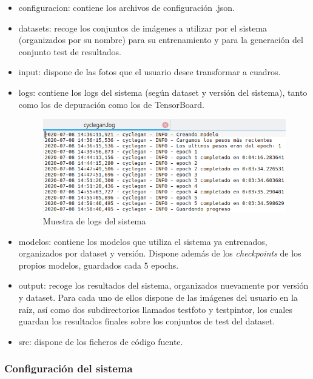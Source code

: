 \documentclass[../main.tex]{subfiles}
\begin{document}
\begin{itemize}
    \item configuracion: contiene los archivos de configuración .json.
    \item datasets: recoge los conjuntos de imágenes a utilizar por el sistema (organizados por su nombre) para su entrenamiento y para la generación del conjunto test de resultados.
    \item input: dispone de las fotos que el usuario desee transformar a cuadros.
    \item logs: contiene los logs del sistema (según dataset y versión del sistema), tanto como los de depuración como los de TensorBoard.
        \begin{figure}[h!]
            \centering
            \includegraphics[width=1\textwidth]{imagenes/muestra_logs_cyclegan.png}
            \caption{Muestra de logs del sistema}
            \label{fig:muestra_logs_cyclegan}
        \end{figure}
    \item modelos: contiene los modelos que utiliza el sistema ya entrenados, organizados por dataset y versión. Dispone además de los \textit{checkpoints} de los propios modelos, guardados cada 5 epochs.
    \item output: recoge los resultados del sistema, organizados nuevamente por versión y dataset. Para cada uno de ellos dispone de las imágenes del usuario en la raíz, así como dos subdirectorios llamados test\textunderscore foto y test\textunderscore pintor, los cuales guardan los resultados finales sobre los conjuntos de test del dataset.
    \item src: dispone de los ficheros de código fuente.
\end{itemize}

\subsubsection{Configuración del sistema}
\end{document}
